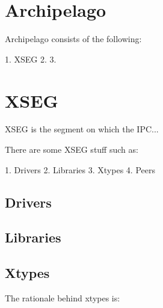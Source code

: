 \section{Archipelago}

Archipelago consists of the following:

1. XSEG
2.
3.

\section{XSEG}

XSEG is the segment on which the IPC...

There are some XSEG stuff such as:

1. Drivers
2. Libraries
3. Xtypes
4. Peers

\subsection{Drivers}

\subsection{Libraries}

\subsection{Xtypes}

The rationale behind xtypes is:

